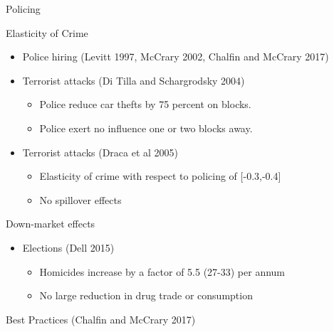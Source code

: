 \documentclass[10pt,ignorenonframetext,]{beamer}
\providecommand{\tightlist}{%
  \setlength{\itemsep}{0pt}\setlength{\parskip}{0pt}}
\begin{document}
\begin{frame}{Policing}
\protect\hypertarget{policing}{}

Elasticity of Crime

\begin{itemize}
\tightlist
\item
  Police hiring (Levitt 1997, McCrary 2002, Chalfin and McCrary 2017)
\item
  Terrorist attacks (Di Tilla and Schargrodsky 2004)

  \begin{itemize}
  \tightlist
  \item
    Police reduce car thefts by 75 percent on blocks.
  \item
    Police exert no influence one or two blocks away.
  \end{itemize}
\item
  Terrorist attacks (Draca et al 2005)

  \begin{itemize}
  \tightlist
  \item
    Elasticity of crime with respect to policing of {[}-0.3,-0.4{]}
  \item
    No spillover effects
  \end{itemize}
\end{itemize}

Down-market effects

\begin{itemize}
\tightlist
\item
  Elections (Dell 2015)

  \begin{itemize}
  \tightlist
  \item
    Homicides increase by a factor of 5.5 (27-33) per annum
  \item
    No large reduction in drug trade or consumption
  \end{itemize}
\end{itemize}

Best Practices (Chalfin and McCrary 2017)

\end{frame}
\end{document}
